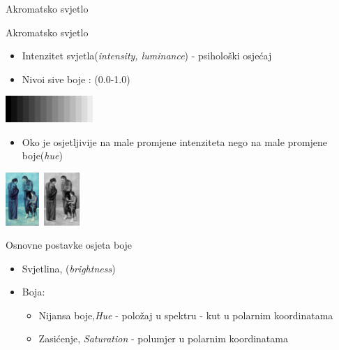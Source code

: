 \documentclass[9pt]{beamer}
\begin{document}
\begin{frame}{Akromatsko svjetlo}
	\begin{block}{Akromatsko svjetlo}
		\begin{itemize}
			\item Intenzitet svjetla(\textsl{intensity, luminance}) - psihološki osjećaj
			\item Nivoi sive boje : (0.0-1.0)
		\end{itemize}
		
		\begin{center}
			\includegraphics[height=1cm]{slike/mach_banding.png}
		\end{center}
		\begin{itemize}
			\item Oko je osjetljivije na male promjene intenziteta nego na male promjene boje(\textsl{hue})
		\end{itemize}
		
		\begin{center}
			\includegraphics[height=2cm]{slike/poor_people_blue.png}\ 
			\includegraphics[height=2cm]{slike/poor_people_gray.png}
		\end{center}
	\end{block}
\end{frame}

\begin{frame}{Osnovne postavke osjeta boje}
	\begin{itemize}
		\item Svjetlina, (\textsl{brightness})
		\item Boja:
		\begin{itemize}
			\item Nijansa boje,\textsl{Hue} - položaj u spektru - kut u polarnim koordinatama
			\item Zasićenje, \textsl{Saturation} - polumjer u polarnim koordinatama
		\end{itemize}
	\end{itemize}
\end{frame}
\end{document}
